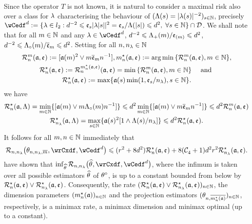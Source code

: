 \begin{rmk} Since the operator $T$ is not known, it is natural to
  consider a maximal risk also over a class for $\edf$ characterising the behaviour of
  $\Nsuite[s]{\iSv[s]= \vert \fedf[(s)] \vert ^{-2}}$, precisely $\rwCedf:=\{\edf\in\lp[2]:\edfCr^{-2}\leq\edfCw[s] \vert \fedf[ \vert s \vert ] \vert ^{2}=
\edfCw[s]/\iSv[ \vert s \vert ]\leq \edfCr^{2},\;\forall s\in\Nz\}\cap\cD$.
We shall note that for all $\Di\in\Nz$ and any $\edf\in\rwCedf$,
$\edfCr^{-2}\leq\miSv/\edfCwm\leq \edfCr^{2}$,
$\edfCr^{-2}\leq\oiSv/\edfCwo\leq \edfCr^{2}$. Setting
for all $\ssY,\ssE\in\Nz$
\begin{multline}\label{mm:de:mnra}
 \dRa{\Di}{\xdfCw[],\edfCw[]}:=[\xdfCw^2\vee\Di\edfCwo \ssY^{-1}],
\hfill
\mnDi(\xdfCw[],\edfCw[]):=\argmin\Nset[{\Di\in\Nz}]{\dRa{\Di}{\xdfCw[],\edfCw[]}},\hfill\\\mnRa{\xdfCw[],\edfCw[]}:=\dRa{\mnDi({\xdfCw[],\edfCw[]})}{\xdfCw[],\edfCw[]}=\min\Nset[{\Di\in\Nz}]{\dRa{\Di}{\xdfCw[],\edfCw[]}}\quad\text{
  and }\\
\mnRa{\xdfCw[],\edfCw[]}:=\max\{\xdfCw[(s)]\min(1,\edfCw[s]/\ssE),s\in\Nz\}.
\end{multline}
we have 
\begin{multline}\label{oo:e11}
 \mnRa{\xdfCw[],\Lambda}=\min_{\Di\in\Nz}\{[\xdfCw\vee\Di\oiSv\ssY^{-1}]\}\leq
 \edfCr^2\min_{\Di\in\Nz}\{[\xdfCw\vee\Di\edfCwo\ssY^{-1}]\}\leq \edfCr^2\dRa{\Di}{\xdfCw[],\edfCw[]}\\ 
  \mmRa{\xdfCw[],\Lambda}=\max_{s\in\Nz}\{\xdfCw[(s)]^2[1\wedge \iSv[s]/\ssE]\}\leq\edfCr^2\mnRa{\xdfCw[],\edfCw[]}.
\end{multline}
It follows for all $\Di,\ssY\in\Nz$ immediately that 
\begin{equation}\label{oo:e12}
  \nmRi{\hxdfPr}{\rwCxdf,\rwCedf}
  \leq (\xdfCr^2+8\edfCr^2) \mnRa{\xdfCw[],\edfCw[]}
+8(\cst{4}+1)\edfCr^2\xdfCr^2\mmRa{\xdfCw[],\edfCw[]}.
\end{equation}
 have shown  that
  $\inf_{\hxdf}\nmRi{\hxdf}{\rwCxdf,\rwCedf}$, where the infimum is taken over all
  possible estimators $\hxdf$ of $\xdf$, is up to a constant bounded
  from below by $\mnRa{\xdfCw[],\edfCw[]}\vee\mmRa{\xdfCw[],\edfCw[]} $.  Consequently, the rate
  $\Nsuite[n]{\mnRa{\xdfCw[],\edfCw[]}\vee\mmRa{\xdfCw[],\edfCw[]}}$, the dimension parameters $\Nsuite[n]{\mnDi(\xdfCw[])}$
  and the projection estimators $\Nsuite[n]{\txdfPr[\mnDi({\xdfCw[]})]}$, respectively, is a
  minimax rate, a minimax dimension and minimax optimal (up to a
  constant).
\remEnd
\end{rmk}


